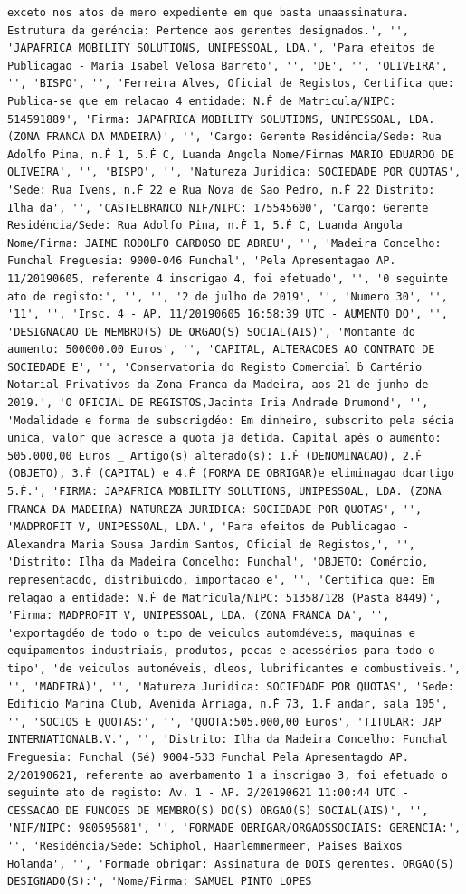 \documentclass[
  12pt,
]{article}
\begin{document}
\begin{verbatim}
exceto nos atos de mero expediente em que basta umaassinatura. Estrutura da geréncia: Pertence aos gerentes designados.', '', 'JAPAFRICA MOBILITY SOLUTIONS, UNIPESSOAL, LDA.', 'Para efeitos de Publicagao - Maria Isabel Velosa Barreto', '', 'DE', '', 'OLIVEIRA', '', 'BISPO', '', 'Ferreira Alves, Oficial de Registos, Certifica que: Publica-se que em relacao 4 entidade: N.Ḟ de Matricula/NIPC: 514591889', 'Firma: JAPAFRICA MOBILITY SOLUTIONS, UNIPESSOAL, LDA. (ZONA FRANCA DA MADEIRA)', '', 'Cargo: Gerente Residéncia/Sede: Rua Adolfo Pina, n.Ḟ 1, 5.Ḟ C, Luanda Angola Nome/Firmas MARIO EDUARDO DE OLIVEIRA', '', 'BISPO', '', 'Natureza Juridica: SOCIEDADE POR QUOTAS', 'Sede: Rua Ivens, n.Ḟ 22 e Rua Nova de Sao Pedro, n.Ḟ 22 Distrito: Ilha da', '', 'CASTELBRANCO NIF/NIPC: 175545600', 'Cargo: Gerente Residéncia/Sede: Rua Adolfo Pina, n.Ḟ 1, 5.Ḟ C, Luanda Angola Nome/Firma: JAIME RODOLFO CARDOSO DE ABREU', '', 'Madeira Concelho: Funchal Freguesia: 9000-046 Funchal', 'Pela Apresentagao AP. 11/20190605, referente 4 inscrigao 4, foi efetuado', '', '0 seguinte ato de registo:', '', '', '2 de julho de 2019', '', 'Numero 30', '', '11', '', 'Insc. 4 - AP. 11/20190605 16:58:39 UTC - AUMENTO DO', '', 'DESIGNACAO DE MEMBRO(S) DE ORGAO(S) SOCIAL(AIS)', 'Montante do aumento: 500000.00 Euros', '', 'CAPITAL, ALTERACOES AO CONTRATO DE SOCIEDADE E', '', 'Conservatoria do Registo Comercial ḃ Cartério Notarial Privativos da Zona Franca da Madeira, aos 21 de junho de 2019.', 'O OFICIAL DE REGISTOS,Jacinta Iria Andrade Drumond', '', 'Modalidade e forma de subscrigdéo: Em dinheiro, subscrito pela sécia unica, valor que acresce a quota ja detida. Capital apés o aumento: 505.000,00 Euros _ Artigo(s) alterado(s): 1.Ḟ (DENOMINACAO), 2.Ḟ (OBJETO), 3.Ḟ (CAPITAL) e 4.Ḟ (FORMA DE OBRIGAR)e eliminagao doartigo 5.Ḟ.', 'FIRMA: JAPAFRICA MOBILITY SOLUTIONS, UNIPESSOAL, LDA. (ZONA FRANCA DA MADEIRA) NATUREZA JURIDICA: SOCIEDADE POR QUOTAS', '', 'MADPROFIT V, UNIPESSOAL, LDA.', 'Para efeitos de Publicagao - Alexandra Maria Sousa Jardim Santos, Oficial de Registos,', '', 'Distrito: Ilha da Madeira Concelho: Funchal', 'OBJETO: Comércio, representacdo, distribuicdo, importacao e', '', 'Certifica que: Em relagao a entidade: N.Ḟ de Matricula/NIPC: 513587128 (Pasta 8449)', 'Firma: MADPROFIT V, UNIPESSOAL, LDA. (ZONA FRANCA DA', '', 'exportagdéo de todo o tipo de veiculos automdéveis, maquinas e equipamentos industriais, produtos, pecas e acessérios para todo o tipo', 'de veiculos automéveis, dleos, lubrificantes e combustiveis.', '', 'MADEIRA)', '', 'Natureza Juridica: SOCIEDADE POR QUOTAS', 'Sede: Edificio Marina Club, Avenida Arriaga, n.Ḟ 73, 1.Ḟ andar, sala 105', '', 'SOCIOS E QUOTAS:', '', 'QUOTA:505.000,00 Euros', 'TITULAR: JAP INTERNATIONALB.V.', '', 'Distrito: Ilha da Madeira Concelho: Funchal Freguesia: Funchal (Sé) 9004-533 Funchal Pela Apresentagdo AP. 2/20190621, referente ao averbamento 1 a inscrigao 3, foi efetuado o seguinte ato de registo: Av. 1 - AP. 2/20190621 11:00:44 UTC - CESSACAO DE FUNCOES DE MEMBRO(S) DO(S) ORGAO(S) SOCIAL(AIS)', '', 'NIF/NIPC: 980595681', '', 'FORMADE OBRIGAR/ORGAOSSOCIAIS: GERENCIA:', '', 'Residéncia/Sede: Schiphol, Haarlemmermeer, Paises Baixos Holanda', '', 'Formade obrigar: Assinatura de DOIS gerentes. ORGAO(S) DESIGNADO(S):', 'Nome/Firma: SAMUEL PINTO LOPES 
\end{verbatim}
\end{document}
